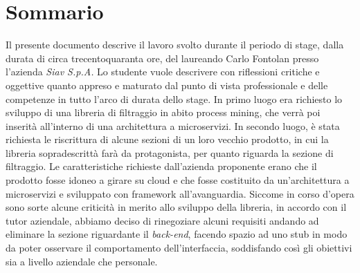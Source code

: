 
\cleardoublepage
{}
{}
\begingroup
\let\clearpage\relax
\let\cleardoublepage\relax
\let\cleardoublepage\relax

\chapter*{Sommario}

Il presente documento descrive il lavoro svolto durante il periodo di stage, dalla durata di circa trecentoquaranta ore, del laureando Carlo Fontolan presso l'azienda \textit{Siav S.p.A.}
Lo studente vuole descrivere con riflessioni critiche e oggettive quanto appreso e maturato dal punto di vista professionale e delle competenze in tutto l'arco di durata dello stage.
In primo luogo era richiesto lo sviluppo di una libreria di filtraggio in abito process mining, che verrà poi inserità all'interno di una architettura a microservizi.
In secondo luogo, è stata richiesta le riscrittura di alcune sezioni di un loro vecchio prodotto, in cui la libreria sopradescrittà farà da protagonista, per quanto riguarda la sezione di filtraggio. Le caratteristiche richieste dall’azienda proponente erano che il prodotto fosse idoneo a girare su cloud e che fosse costituito da un’architettura a microservizi e sviluppato con framework all'avanguardia.
Siccome in corso d'opera sono sorte alcune criticità in merito allo sviluppo della libreria, in accordo con il tutor aziendale, abbiamo deciso di rinegoziare alcuni requisiti andando ad eliminare la sezione riguardante il  \textit{back-end}, facendo spazio ad uno stub in modo da poter osservare il comportamento dell'interfaccia, soddisfando così gli obiettivi sia a livello aziendale che personale. 


%
%

\endgroup			

\vfill

